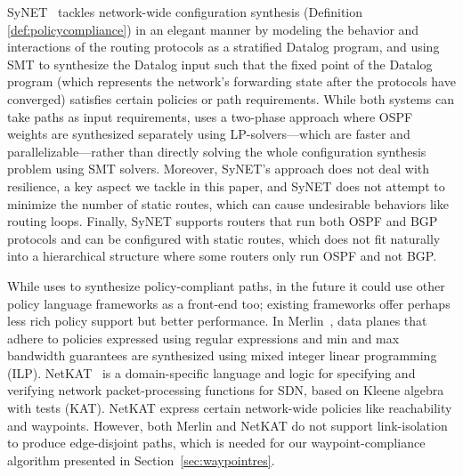 SyNET~\cite{synet} tackles network-wide configuration synthesis
(Definition \ref{def:policycompliance}) in an elegant manner by
modeling the behavior and interactions of the routing protocols as a
stratified Datalog program, and using SMT to synthesize the Datalog
input such that the fixed point of the Datalog program (which
represents the network's forwarding state after the protocols have
converged) satisfies certain policies or path requirements.  While
both systems can take paths as input requirements, \name uses
a two-phase approach where OSPF weights are synthesized
separately using
LP-solvers---which are faster and parallelizable---rather than directly  
solving the whole configuration synthesis problem using SMT solvers.  
Moreover, SyNET's approach
does not deal with resilience, a key aspect we tackle in this paper,
and SyNET does not attempt to minimize the number of static routes,
which can cause undesirable behaviors like routing loops.  Finally,
SyNET supports routers that run both OSPF and BGP protocols and can be
configured with static routes, which does not fit naturally into a
hierarchical structure where some routers only run OSPF and not
BGP. 

 While \name uses \genesis 
to synthesize policy-compliant paths, in the future it could use
other policy language frameworks as a front-end
too; existing frameworks offer perhaps less rich policy support but better
performance. %
In Merlin~\cite{merlin}, data planes that adhere to policies expressed
using regular expressions and min and max
bandwidth guarantees are synthesized using mixed
integer linear programming (ILP). 
NetKAT~\cite{netkat} is a domain-specific language and logic for 
specifying and verifying network packet-processing functions
for SDN, based on Kleene algebra with tests (KAT). NetKAT 
express certain network-wide policies like reachability and waypoints.
However, both Merlin and NetKAT do not support link-isolation 
to produce edge-disjoint paths, which is needed for  
our waypoint-compliance algorithm presented in Section~\ref{sec:waypointres}.



